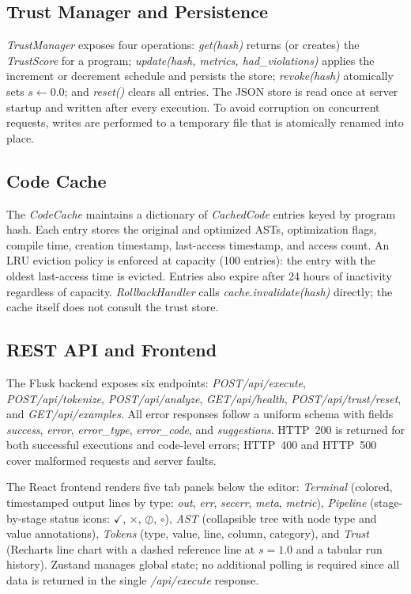 \documentclass[conference]{IEEEtran}
\begin{document}
\subsection{Trust Manager and Persistence}

\textit{TrustManager} exposes four operations:
\textit{get(hash)} returns (or creates) the
\textit{TrustScore} for a program; \textit{update(hash, metrics,
had\_violations)} applies the increment or decrement schedule and
persists the store; \textit{revoke(hash)} atomically sets
$s\leftarrow0.0$; and \textit{reset()} clears all entries.
The JSON store is read once at server startup and written after
every execution. To avoid corruption on concurrent requests,
writes are performed to a temporary file that is atomically renamed
into place.

\subsection{Code Cache}

The \textit{CodeCache} maintains a dictionary of
\textit{CachedCode} entries keyed by program hash. Each entry
stores the original and optimized ASTs, optimization flags, compile
time, creation timestamp, last-access timestamp, and access count.
An LRU eviction policy is enforced at capacity (100 entries): the
entry with the oldest last-access time is evicted. Entries also
expire after 24 hours of inactivity regardless of capacity.
\textit{RollbackHandler} calls \textit{cache.invalidate(hash)}
directly; the cache itself does not consult the trust store.

\subsection{REST API and Frontend}

The Flask backend exposes six endpoints:
\textit{POST\;/api/execute},
\textit{POST\;/api/tokenize},
\textit{POST\;/api/analyze},
\textit{GET\;/api/health},
\textit{POST\;/api/trust/reset}, and
\textit{GET\;/api/examples}.
All error responses follow a uniform schema with fields
\textit{success}, \textit{error}, \textit{error\_type},
\textit{error\_code}, and \textit{suggestions}. HTTP~200 is
returned for both successful executions and code-level errors;
HTTP~400 and HTTP~500 cover malformed requests and server faults.

The React frontend renders five tab panels below the editor:
\emph{Terminal} (colored, timestamped output lines by type:
\textit{out}, \textit{err}, \textit{secerr}, \textit{meta},
\textit{metric}), \emph{Pipeline} (stage-by-stage status icons:
$\checkmark$, $\times$, $\oslash$, $\circ$), \emph{AST}
(collapsible tree with node type and value annotations),
\emph{Tokens} (type, value, line, column, category), and
\emph{Trust} (Recharts line chart with a dashed reference line at
$s=1.0$ and a tabular run history). Zustand manages global state;
no additional polling is required since all data is returned in the
single \textit{/api/execute} response.
\end{document}

